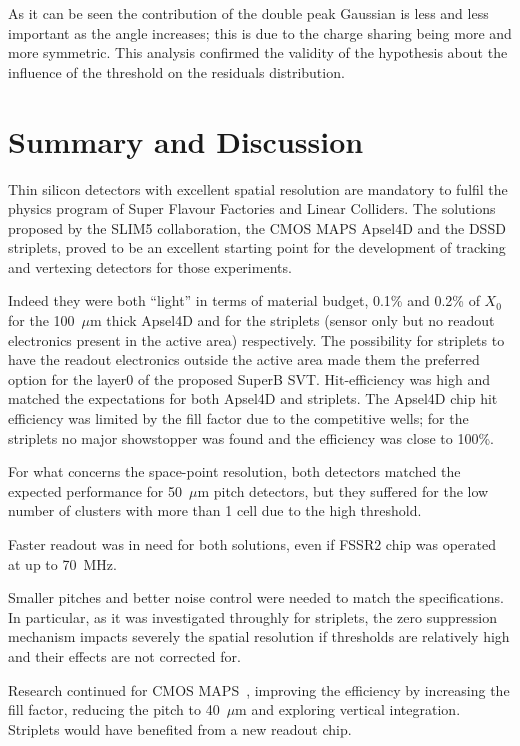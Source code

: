 As it can be seen the contribution of the double peak Gaussian is less and less important as the 
angle increases; this is due to the charge sharing being more and more symmetric. This analysis 
confirmed the validity of the hypothesis about the influence of the threshold on the residuals 
distribution.


 \section{Summary and Discussion}
 \label{sec:Slim5Summary}
 
 Thin  silicon detectors with excellent spatial resolution  are mandatory to fulfil the physics program 
 of Super Flavour Factories and Linear Colliders. 
 The solutions proposed by the SLIM5 collaboration, the CMOS MAPS Apsel4D and the DSSD 
 striplets, proved to be an excellent starting point for the development of tracking and vertexing 
 detectors for those experiments. 
 
 Indeed they were both ``light'' in terms of material budget, 0.1\% and 0.2\% of $X_0$ for the 
 100~$\mu$m thick Apsel4D and for the striplets (sensor only but no readout electronics present in 
 the active area) respectively. The possibility for striplets to have the readout electronics outside 
 the active area made them the preferred option for the layer0 of the proposed SuperB SVT.
 Hit-efficiency was high and matched the expectations for both Apsel4D and striplets. The 
 Apsel4D chip hit efficiency was limited by the fill factor due to the competitive wells; 
 for the striplets no major showstopper was found and the efficiency was  close to 100\%.

 For what concerns 
 the space-point resolution, both detectors matched the expected performance for  50~$\mu$m pitch 
 detectors, 
 but they suffered for the low number of clusters with more than 1 cell due to the high threshold. 
  
  Faster readout was in need for both solutions, even if FSSR2 chip was operated at up to 
  70~MHz.
  
 Smaller pitches and better noise control were needed to 
 match the specifications. In particular, as it was investigated throughly for striplets, the zero suppression 
 mechanism  impacts severely the spatial resolution if thresholds are relatively high and their effects are not 
 corrected for. 
 
 Research continued for CMOS MAPS~\cite{Rizzo:2013aza}, improving the efficiency by increasing 
 the fill factor, reducing the pitch to 40~$\mu$m and exploring vertical integration. 
 Striplets would have benefited from a new readout chip.

